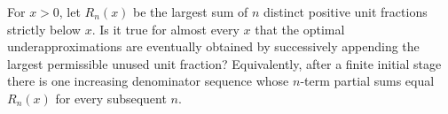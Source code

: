 For $x>0$, let $R_n(x)$ be the largest sum of $n$ distinct positive unit fractions strictly below $x$. Is it true for almost every $x$ that the optimal underapproximations are eventually obtained by successively appending the largest permissible unused unit fraction? Equivalently, after a finite initial stage there is one increasing denominator sequence whose $n$-term partial sums equal $R_n(x)$ for every subsequent $n$.
